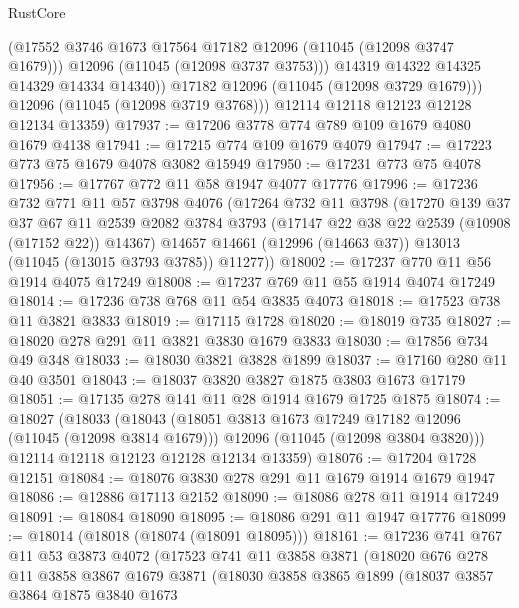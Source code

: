 \begin{lexlean}{RustCore}
\begin{coremodule}
                (@17552 @3746 @1673 @17564 @17182 @12096 (@11045 (@12098 @3747 @1679)))
                @12096
                (@11045 (@12098 @3737 @3753)))
              @14319
              @14322
              @14325
              @14329
              @14334
              @14340))
          @17182
          @12096
          (@11045 (@12098 @3729 @1679)))
        @12096
        (@11045 (@12098 @3719 @3768)))
      @12114
      @12118
      @12123
      @12128
      @12134
      @13359)
@17937 := @17206 @3778 @774 @789 @109 @1679 @4080 @1679 @4138
@17941 := @17215 @774 @109 @1679 @4079
@17947 := @17223 @773 @75 @1679 @4078 @3082 @15949
@17950 := @17231 @773 @75 @4078
@17956 := @17767 @772 @11 @58 @1947 @4077 @17776
@17996 := @17236
    @732
    @771
    @11
    @57
    @3798
    @4076
    (@17264
      @732
      @11
      @3798
      (@17270
        @139
        @37
        @37
        @67
        @11
        @2539
        @2082
        @3784
        @3793
        (@17147 @22 @38 @22 @2539 (@10908 (@17152 @22)) @14367)
        @14657
        @14661
        (@12996 (@14663 @37))
        @13013
        (@11045 (@13015 @3793 @3785))
        @11277))
@18002 := @17237 @770 @11 @56 @1914 @4075 @17249
@18008 := @17237 @769 @11 @55 @1914 @4074 @17249
@18014 := @17236 @738 @768 @11 @54 @3835 @4073
@18018 := @17523 @738 @11 @3821 @3833
@18019 := @17115 @1728
@18020 := @18019 @735
@18027 := @18020 @278 @291 @11 @3821 @3830 @1679 @3833
@18030 := @17856 @734 @49 @348
@18033 := @18030 @3821 @3828 @1899
@18037 := @17160 @280 @11 @40 @3501
@18043 := @18037 @3820 @3827 @1875 @3803 @1673 @17179
@18051 := @17135 @278 @141 @11 @28 @1914 @1679 @1725 @1875
@18074 := @18027
    (@18033
      (@18043
        (@18051 @3813 @1673 @17249 @17182 @12096 (@11045 (@12098 @3814 @1679)))
        @12096
        (@11045 (@12098 @3804 @3820)))
      @12114
      @12118
      @12123
      @12128
      @12134
      @13359)
@18076 := @17204 @1728 @12151
@18084 := @18076 @3830 @278 @291 @11 @1679 @1914 @1679 @1947
@18086 := @12886 @17113 @2152
@18090 := @18086 @278 @11 @1914 @17249
@18091 := @18084 @18090
@18095 := @18086 @291 @11 @1947 @17776
@18099 := @18014 (@18018 (@18074 (@18091 @18095)))
@18161 := @17236
    @741
    @767
    @11
    @53
    @3873
    @4072
    (@17523
      @741
      @11
      @3858
      @3871
      (@18020
        @676
        @278
        @11
        @3858
        @3867
        @1679
        @3871
        (@18030
          @3858
          @3865
          @1899
          (@18037
            @3857
            @3864
            @1875
            @3840
            @1673

\end{coremodule}
\end{lexlean}
